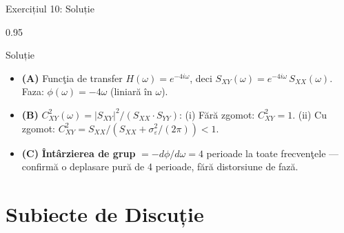\documentclass[9pt, aspectratio=169, t]{beamer}
\begin{document}
\begin{frame}{Exercițiul 10: Soluție}
    \begin{cminipage}{0.95\textwidth}
    \begin{exampleblock}{Soluție}
        {\small
        \begin{itemize}\setlength{\itemsep}{0pt}
            \item \textcolor{MainBlue}{\textbf{(A)}} Funcţia de transfer $H(\omega) = e^{-4i\omega}$, deci $S_{XY}(\omega) = e^{-4i\omega}\,S_{XX}(\omega)$.
            Faza: $\phi(\omega) = -4\omega$ (liniară în $\omega$).
            \item \textcolor{MainBlue}{\textbf{(B)}} $C^2_{XY}(\omega) = |S_{XY}|^2/(S_{XX} \cdot S_{YY})$:
            (i) Fără zgomot: $C^2_{XY}=1$. \quad (ii) Cu zgomot: $C^2_{XY} = S_{XX}/(S_{XX}+\sigma^2_\varepsilon/(2\pi)) < 1$.
            \item \textcolor{MainBlue}{\textbf{(C)}} \textbf{Întârzierea de grup} $= -d\phi/d\omega = 4$ perioade la toate frecvenţele --- confirmă o deplasare pură de 4 perioade, fără distorsiune de fază.
        \end{itemize}
        }
    \end{exampleblock}
    \end{cminipage}
\end{frame}

\section{Subiecte de Discuție}
\end{document}

